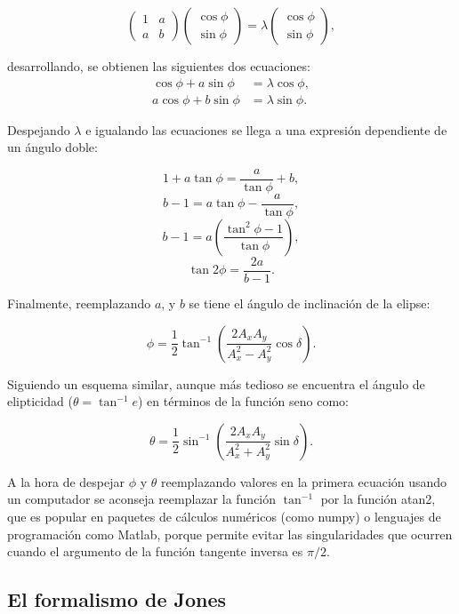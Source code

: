 \[\begin{pmatrix}
1 & a\\
 a & b 
\end{pmatrix} 
\begin{pmatrix}
\cos{\phi}\\
 \sin{\phi} 
\end{pmatrix} =
\lambda \begin{pmatrix}
\cos{\phi}\\
 \sin{\phi} 
\end{pmatrix} ,
\]

desarrollando, se obtienen las siguientes dos ecuaciones:
\begin{align*}
\cos{\phi} +a\sin{\phi} &= \lambda\cos{\phi},\\
a\cos{\phi} +b\sin{\phi} &= \lambda\sin{\phi}.
\end{align*}

Despejando $\lambda$ e igualando las ecuaciones se llega a una
expresión dependiente de un ángulo doble:

\[1+a\tan{\phi} = \frac{a}{\tan{\phi}}+b,\]
\[b-1= a\tan{\phi} -\frac{a}{\tan{\phi}},\]
\[ b-1=a\left(\frac{\tan^2{\phi} -1}{\tan{\phi}}\right),\]
\[\tan{2\phi} =\frac{2a}{b-1}.\]

Finalmente, reemplazando $a$, y $b$ se tiene el ángulo de inclinación
de la elipse:

\begin{equation*}
\phi = \frac{1}{2}\tan^{-1}{\left(\frac{2A_xA_y}{A_x^2-A_y^2}\cos{\delta}\right)}.
\end{equation*}

Siguiendo un esquema similar, aunque más tedioso se encuentra el
ángulo de elipticidad ($\theta = \tan^{-1}{e}$) en términos de la
función seno como:

\begin{equation*}
\theta = \frac{1}{2}\sin^{-1}{\left(\frac{2A_xA_y}{A_x^2+A_y^2}\sin{\delta}\right)}.
\end{equation*}

A la hora de despejar $\phi$ y $\theta$ reemplazando valores en la
primera ecuación usando un computador se aconseja reemplazar la función
$\tan^{-1}$ por la función atan2, que es popular en paquetes de
cálculos numéricos (como numpy) o lenguajes de programación como
Matlab, porque permite evitar las singularidades que ocurren cuando el argumento de la
función tangente inversa es $\pi/2$.

\subsection{El formalismo de Jones}

